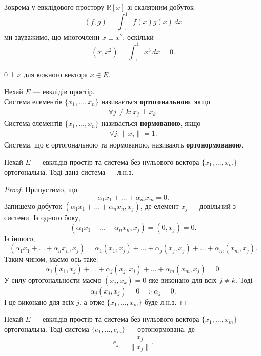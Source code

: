 \documentclass{math_library}
\begin{document}
\begin{example}
Зокрема у евклідового простору $\mathbb{R}[x]$ зі скалярним добуток 
\[
(f,g) = \displaystyle\int_{-1}^1 f(x)g(x)\,dx
\]
ми зауважимо, що многочлени $x \perp x^2$, оскільки 
\[
(x,x^2) = \displaystyle\int_{-1}^1 x^3\,dx = 0.
\]
\end{example}

\begin{remark}
$0 \perp x$ для кожного вектора $x \in E$.
\end{remark}

\begin{definition}
Нехай $E$ --- евклідів простір.\\
Система елементів $\{x_1,\dots,x_n\}$ називається \textbf{ортогональною}, якщо
\begin{align*}
\forall j \neq k: x_j \perp x_k.
\end{align*}
Система елементів $\{x_1,\dots,x_n\}$ називається \textbf{нормованою}, якщо
\begin{align*}
\forall j: \|x_j\| = 1.
\end{align*}
Система, що є ортогональною та нормованою, називають \textbf{ортонормованою}.
\end{definition}

\begin{proposition}
Нехай $E$ --- евклідів простір та система без нульового вектора $\{x_1,\dots,x_m\}$ --- ортогональна. Тоді дана система --- л.н.з.
\end{proposition}

\begin{proof}
Припустимо, що
\[
\alpha_1 x_1 + \dots + \alpha_m x_m = 0.
\]
Запишемо добуток $(\alpha_1 x_1 + \dots + \alpha_n x_n, x_j)$, де елемент $x_j$ --- довільний з системи. Із одного боку,
\[
(\alpha_1 x_1 + \dots + \alpha_n x_n, x_j) = (0,x_j) = 0.
\]
Із іншого,
\[
(\alpha_1 x_1 + \dots + \alpha_n x_n, x_j) = \alpha_1 (x_1,x_j) + \dots + \alpha_j (x_j,x_j) + \dots + \alpha_m (x_m,x_j).
\]
Таким чином, маємо ось таке:
\[
\alpha_1 (x_1,x_j) + \dots + \alpha_j (x_j,x_j) + \dots + \alpha_m (x_m,x_j) = 0.
\]
У силу ортогональности маємо $(x_j,x_k) = 0$ яке виконано для всіх $j \neq k$. Тоді
\[
\alpha_j (x_j,x_j) = 0 \implies \alpha_j = 0.
\]
І це виконано для всіх $j$, а отже $\{x_1,\dots,x_m\}$ буде л.н.з.
\end{proof}

\begin{proposition}
\label{orthogonal_to_orthonormal}
Нехай $E$ --- евклідів простір та система без нульового вектора $\{x_1,\dots,x_m\}$ --- ортогональна. Тоді система $\{e_1,\dots,e_m\}$ --- ортонормована, де
\begin{align*}
e_j = \dfrac{x_j}{\|x_j\|}.
\end{align*}
\end{proposition}
\end{document}
